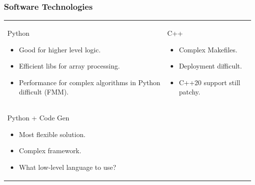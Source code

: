 \documentclass[dvipsnames,10pt]{beamer}
\begin{document}
\begin{frame}
\frametitle{Software Technologies}

\begin{tabular}{ll}
\begin{minipage}[t]{6cm}
{\color{blue} Python}
\begin{itemize}
\item Good for higher level logic.
\item Efficient libs for array processing.
\item Performance for complex algorithms in Python difficult (FMM).
\end{itemize}
\end{minipage} &
\begin{minipage}[t]{6cm}
{\color{blue} C++}
\begin{itemize}
\item Complex Makefiles.
\item Deployment difficult.
\item C++20 support still patchy.
\end{itemize}
\end{minipage}\\
\begin{minipage}[t]{6cm}
{\color{blue}Python + Code Gen}
\begin{itemize}
\item Most flexible solution.
\item Complex framework.
\item What low-level language to use?
\end{itemize}
\end{minipage} & 
\end{tabular}

\end{frame}
\end{document}
